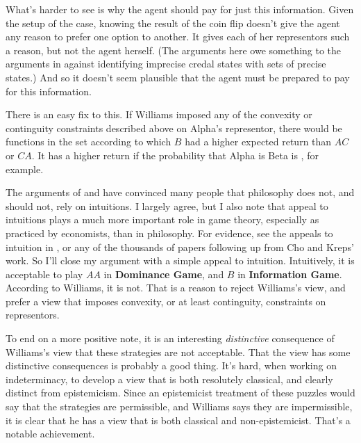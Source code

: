 What's harder to see is why the agent should pay for just this information. Given the setup of the case, knowing the result of the coin flip doesn't give the agent any reason to prefer one option to another. It gives each of her representors such a reason, but not the agent herself. (The arguments here owe something to the arguments in \citet{Walley1991} against identifying imprecise credal states with sets of precise states.) And so it doesn't seem plausible that the agent must be prepared to pay for this information.

There is an easy fix to this. If Williams imposed any of the convexity or continguity constraints described above on Alpha's representor, there would be functions in the set according to which $B$ had a higher expected return than $AC$ or $CA$. It has a higher return if the probability that Alpha is Beta is , for example.

The arguments of \citet{Williamson2007-WILTPO-17} and \citet{Cappelen2012} have convinced many people that philosophy does not, and should not, rely on intuitions. I largely agree, but I also note that appeal to intuitions plays a much more important role in game theory, especially as practiced by economists, than in philosophy. For evidence, see the appeals to intuition in \citet{ChoKreps1987}, or any of the thousands of papers following up from Cho and Kreps' work. So I'll close my argument with a simple appeal to intuition. Intuitively, it is acceptable to play $AA$ in \textbf{Dominance Game}, and $B$ in \textbf{Information Game}. According to Williams, it is not. That is a reason to reject Williams's view, and prefer a view that imposes convexity, or at least continguity, constraints on representors.

To end on a more positive note, it is an interesting \textit{distinctive} consequence of Williams's view that these strategies are not acceptable. That the view has some distinctive consequences is probably a good thing. It's hard, when working on indeterminacy, to develop a view that is both resolutely classical, and clearly distinct from epistemicism. Since an epistemicist treatment of these puzzles would say that the strategies are permissible, and Williams says they are impermissible, it is clear that he has a view that is both classical and non-epistemicist. That's a notable achievement.